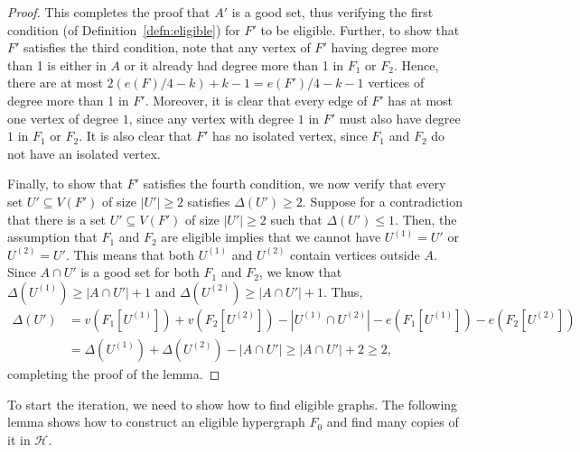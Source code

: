 \documentclass{daj}
\def\cH{\mathcal{H}}
\theoremstyle{plain}
\theoremstyle{remark}
\begin{document}
\begin{proof}
This completes the proof that $A'$ is a good set, thus verifying the first condition (of Definition~\ref{defn:eligible}) for $F'$ to be eligible. Further, to show that $F'$ satisfies the third condition, note that any vertex of $F'$ having degree more than 1 is either in $A$ or it already had degree more than 1 in $F_1$ or $F_2$. Hence, there are at most $2(e(F)/4-k)+k-1=e(F')/4-k-1$ vertices of degree more than 1 in $F'$. Moreover, it is clear that every edge of $F'$ has at most one vertex of degree $1$, since any vertex with degree $1$ in $F'$ must also have degree $1$ in $F_1$ or $F_2$. It is also clear that $F'$ has no isolated vertex, since $F_1$ and $F_2$ do not have an isolated vertex.

Finally, to show that $F'$ satisfies the fourth condition, we now verify that every set $U'\subseteq V(F')$ of size $|U'|\geq 2$ satisfies $\Delta(U')\geq 2$. Suppose for a contradiction that there is a set $U'\subseteq V(F')$ of size $|U'|\geq 2$ such that $\Delta(U')\leq 1$. Then, the assumption that $F_1$ and $F_2$ are eligible implies that we cannot have $U^{(1)}=U'$ or $U^{(2)}=U'$. This means that both $U^{(1)}$ and $U^{(2)}$ contain vertices outside $A$. Since $A\cap U'$ is a good set for both $F_1$ and $F_2$, we know that $\Delta(U^{(1)})\geq |A\cap U'|+1$ and $\Delta(U^{(2)})\geq |A\cap U'|+1$. Thus, 
\begin{align*}
    \Delta(U')&=v(F_1[U^{(1)}])+v(F_2[U^{(2)}])-|U^{(1)}\cap U^{(2)}|-e(F_1[U^{(1)}])-e(F_2[U^{(2)}])\\
    &=\Delta(U^{(1)})+\Delta(U^{(2)})-|A\cap U'|\geq |A\cap U'|+2\geq 2,
\end{align*}
completing the proof of the lemma.
\end{proof}

\noindent
To start the iteration, we need to show how to find eligible graphs. The following lemma shows how to construct an eligible hypergraph $F_0$ and find many copies of it in $\cH$.
\end{document}
